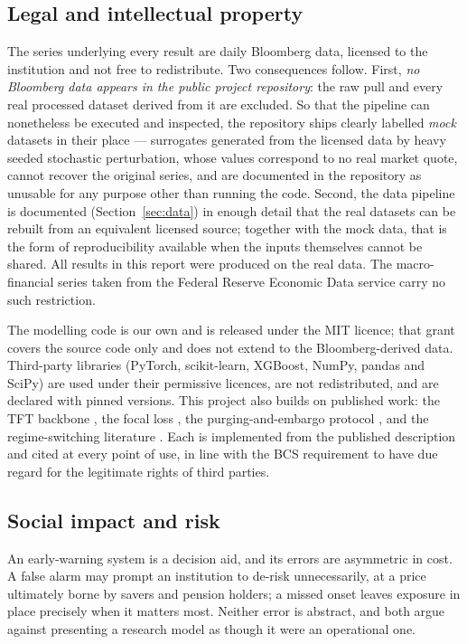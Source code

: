 \documentclass[11pt,a4paper]{article}
\begin{document}
\subsection{Legal and intellectual property}
The series underlying every result are daily Bloomberg data, licensed to the
institution and not free to redistribute. Two consequences follow. First,
\emph{no Bloomberg data appears in the public project repository}: the raw
pull and every real processed dataset derived from it are excluded. So that
the pipeline can nonetheless be executed and inspected, the repository ships
clearly labelled \emph{mock} datasets in their place --- surrogates generated
from the licensed data by heavy seeded stochastic perturbation, whose values
correspond to no real market quote, cannot recover the original series, and
are documented in the repository as unusable for any purpose other than
running the code. Second, the data pipeline is documented
(Section~\ref{sec:data}) in enough detail that the real datasets can be
rebuilt from an equivalent licensed source; together with the mock data, that
is the form of reproducibility available when the inputs themselves cannot be
shared. All results in this report were produced on the real data. The
macro-financial series taken from the Federal Reserve Economic Data service
carry no such restriction.

The modelling code is our own and is released under the MIT licence; that grant
covers the source code only and does not extend to the Bloomberg-derived data.
Third-party libraries (PyTorch, scikit-learn, XGBoost, NumPy, pandas and SciPy)
are used under their permissive licences, are not redistributed, and are
declared with pinned versions. This project also builds on published work: the
TFT backbone \citep{lim2021tft}, the focal loss \citep{lin2017focal}, the
purging-and-embargo protocol \citep{lopezdeprado2018}, and the regime-switching
literature \citep{hamilton1989new,angbekaert2002regime}. Each is implemented
from the published description and cited at every point of use, in line with the
BCS requirement to have due regard for the legitimate rights of third parties.

\subsection{Social impact and risk}
An early-warning system is a decision aid, and its errors are asymmetric in
cost. A false alarm may prompt an institution to de-risk unnecessarily, at a
price ultimately borne by savers and pension holders; a missed onset leaves
exposure in place precisely when it matters most. Neither error is abstract,
and both argue against presenting a research model as though it were an
operational one.
\end{document}
